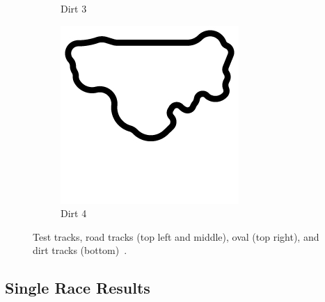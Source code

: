 \begin{figure}
\begin{subfigure}[b]{0.2\textwidth}
       \caption{Dirt 3}
   \end{subfigure}
\begin{subfigure}[b]{0.2\textwidth}
       \includegraphics[width=\textwidth]{img/tracks/Dirt4}
       \caption{Dirt 4}
   \end{subfigure}
   \caption{Test tracks, road tracks (top left and middle), oval (top right), and dirt tracks (bottom)~\protect\cite{TORCS}.}\label{fig:tracks}
\end{figure}

\subsection{Single Race Results}

